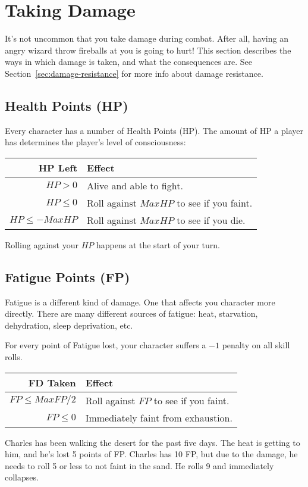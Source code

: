 \section{Taking Damage}
It's not uncommon that you take damage during combat.
After all, having an angry wizard throw fireballs at you is going to hurt!
This section describes the ways in which damage is taken, and what the consequences are.
See Section~\ref{sec:damage-resistance} for more info about damage resistance.

\subsection{Health Points (HP)}\label{sec:health-points}
Every character has a number of Health Points (HP).
The amount of HP a player has determines the player's level of consciousness:

\begin{center}
  \begin{tabular}{r | l}
    \textbf{HP Left} & \textbf{Effect} \\\hline
    $HP > 0$         & Alive and able to fight. \\
    $HP \leq 0$      & Roll against $MaxHP$ to see if you faint. \\
    $HP \leq -MaxHP$ & Roll against $MaxHP$ to see if you die.
  \end{tabular}
\end{center}

\note Rolling against your $HP$ happens at the start of your turn.
  
\subsection{Fatigue Points (FP)}\label{sec:fatigue-points}
Fatigue is a different kind of damage.
One that affects you character more directly.
There are many different sources of fatigue: heat, starvation, dehydration, sleep deprivation, etc.

For every point of Fatigue lost, your character suffers a $-1$ penalty on all skill rolls.

\begin{center}
  \begin{tabular}{r | l}
    \textbf{FD Taken} & \textbf{Effect} \\\hline
    $FP \leq MaxFP/2$ & Roll against $FP$ to see if you faint. \\
    $FP \leq 0$   & Immediately faint from exhaustion.
  \end{tabular}
\end{center}

\example Charles has been walking the desert for the past five days.
The heat is getting to him, and he's lost 5 points of FP.
Charles has 10 FP, but due to the damage, he needs to roll 5 or less to not faint in the sand.
He rolls 9 and immediately collapses.